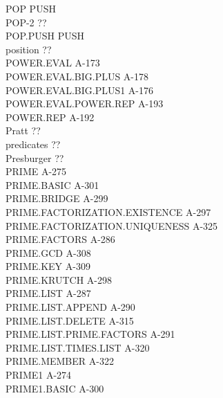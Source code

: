 \documentclass[10pt]{book}
\newenvironment{pubasis}{\begin{flushleft}}{\end{flushleft}}
\begin{document}
\begin{pubasis}
POP                                          PUSH\\
POP-2                                        ??\\
POP.PUSH                                     PUSH\\
position                                     ??\\
POWER.EVAL                                   A-173\\
POWER.EVAL.BIG.PLUS                          A-178\\
POWER.EVAL.BIG.PLUS1                         A-176\\
POWER.EVAL.POWER.REP                         A-193\\
POWER.REP                                    A-192\\
Pratt                                        ??\\
predicates                                   ??\\
Presburger                                   ??\\
PRIME                                        A-275\\
PRIME.BASIC                                  A-301\\
PRIME.BRIDGE                                 A-299\\
PRIME.FACTORIZATION.EXISTENCE                A-297\\
PRIME.FACTORIZATION.UNIQUENESS               A-325\\
PRIME.FACTORS                                A-286\\
PRIME.GCD                                    A-308\\
PRIME.KEY                                    A-309\\
PRIME.KRUTCH                                 A-298\\
PRIME.LIST                                   A-287\\
PRIME.LIST.APPEND                            A-290\\
PRIME.LIST.DELETE                            A-315\\
PRIME.LIST.PRIME.FACTORS                     A-291\\
PRIME.LIST.TIMES.LIST                        A-320\\
PRIME.MEMBER                                 A-322\\
PRIME1                                       A-274\\
PRIME1.BASIC                                 A-300\\

\end{pubasis}
\end{document}

